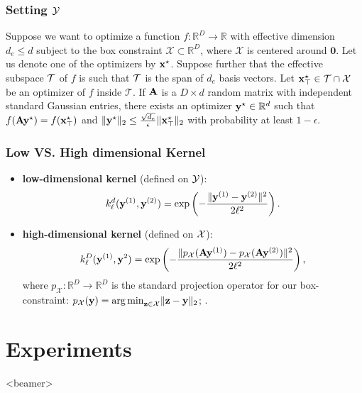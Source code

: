 \documentclass[grey]{beamer}
\begin{document}
 \begin{frame}
  \frametitle{Setting $\cal Y$}
  \begin{theorem}
   \label{prop:2}
   Suppose we want to optimize a function $f: \mathbb{R}^{D} \rightarrow \mathbb{R}$ with effective dimension $d_e \leq d$ subject to the box constraint $\mathcal{X} \subset \mathbb{R}^D$, where $\mathcal{X}$ is centered around $\mathbf{0}$. Let us denote one of the optimizers by $\mathbf{x}^{\star}$.
   Suppose further that the effective subspace $\cal T$ of $f$ is such that $\cal T$ is the span of $d_e$ basis vectors. 
   Let $\mathbf{x}^{\star}_\top \in \cal{T} \cap \mathcal{X}$ be an optimizer of $f$ inside $\mathcal{T}$. 
   If $\mathbf{A}$ is a $D\times d$ random matrix with independent standard Gaussian entries,
   there exists an optimizer $\mathbf{y}^\star \in \mathbb{R}^{d}$ such that $f(\mathbf{A}\mathbf{y}^\star) = f(\mathbf{x}^\star_\top)$ and $\|\mathbf{y}^\star\|_2 \leq \frac{\sqrt{d_e}}{\epsilon}\|\mathbf{x}^{\star}_\top\|_2$ with probability at least $1-\epsilon$.
 \end{theorem}
 \end{frame}
 
 \begin{frame}
  \frametitle{Low VS. High dimensional Kernel}
  \begin{itemize}
   \item {\bf \textcolor{myColor}{low-dimensional kernel}} (defined on 
   {\bf \textcolor{myColor}{$\cal Y$}}):
  \[ k_{\ell}^d(\mathbf{y}^{(1)},\mathbf{y}^{(2)}) = \exp\left({-\frac{\|\mathbf{y}^{(1)}-\mathbf{y}^{(2)}\|^2}{2\ell^2}}\right). \]
   \item {\bf \textcolor{myColor}{high-dimensional kernel}} (defined on 
   {\bf \textcolor{myColor}{$\cal X$}}):  
  $$k_{\ell}^D(\mathbf{y}^{(1)}, \mathbf{y}^2) = \exp\left( -\frac{\| p_{\mathcal{X}}(\mathbf{A}\mathbf{y}^{(1)}) - p_{\mathcal{X}}(\mathbf{A}\mathbf{y}^{(2)}) \|^2}{2\ell^2} \right),$$
where $p_{\mathcal{X}}:\mathbb{R}^D \rightarrow \mathbb{R}^D$ is the standard projection operator for our box-constraint: $p_{\mathcal{X}}(\mathbf{y}) = {\arg \min}_{\mathbf{z}\in \mathcal{X}} \|\mathbf{z}-\mathbf{y}\|_2$; . 
  \end{itemize}

 \end{frame}


 \section{Experiments}
 \begin{frame}<beamer>
  \tableofcontents[currentsection]
 \end{frame}
 
\end{document}
